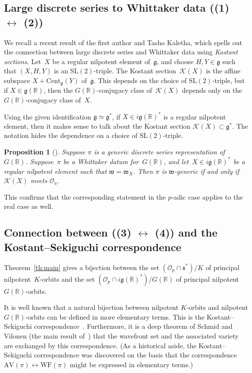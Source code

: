 \documentclass[10pt,leqno]{article}
\newtheorem{proposition}[equation]{Proposition}
\numberwithin{equation}{section}
\renewcommand{\O}{\mathcal O}
\newcommand{\R}{\mathbb R}
\newcommand{\g}{\mathfrak g}
\newcommand{\SL}{\text{SL}}
\newcommand{\s}{\mathfrak s}
\newcommand{\w}{\mathfrak w}
\newcommand{\AV}{\mathrm{AV}}
\newcommand{\WF}{\mathrm{WF}}
\newcommand{\Op}{\O_p}
\newcommand{\Kostant}[1]{\mathcal{K}(#1)}
\begin{document}
\subsection{Large discrete series to Whittaker data ((1) $\leftrightarrow$ (2))}


We recall a recent result of the first author and Tasho Kaletha, which spells out the connection between large discrete series and Whittaker data using  {\it Kostant sections}. Let~$X$ be a regular nilpotent element of~$\g$, and choose  $H, Y \in \g$ such that $(X,H,Y)$ is an  $\SL(2)$-triple. The Kostant section~$\Kostant{X}$ is the affine subspace $X + \mathrm{Cent}_{\g}(Y)$ of~$\g$. This depends on the choice of $\SL(2)$-triple, but if $X \in \g(\R)$, then the $G(\R)$-conjugacy class of~$\Kostant{X}$ depends only on the $G(\R)$-conjugacy class of~$X$. 

Using the given identification $\g \simeq \g^\ast$, if $X \in i\g(\R)^\ast$ is a regular nilpotent element, then it makes sense to talk about the Kostant section $\Kostant{X} \subset \g^\ast$. The notation hides the dependence on a choice of $\mathrm{SL}(2)$-triple. 

\begin{proposition}[\cite{adams_kaletha}]\label{JeffTasho_criterion}
Suppose $\pi$ is a generic discrete series representation of~$G(\R)$. Suppose~$\pi$ be a Whittaker datum for~$G(\R)$, and let~$X \in i\g(\R)^*$ be a regular nilpotent element such that $\w = \w_X$. 
Then $\pi$ is $\w$-generic if and only if $\Kostant{X}$ meets $\mathcal{O}_\pi$. 
\end{proposition}


This confirms that  the corresponding statement  in the $p$-adic case \cite{debacker_reeder_generic, kaletha_epipelagic}
applies to the real case as well.


\subsection{Connection between ((3) $\leftrightarrow$ (4)) and the Kostant--Sekiguchi correspondence } \label{sec:Sekiguchi}

Theorem~\ref{th:main} gives a bijection between the set $(\Op \cap \s^*)/K$ of principal nilpotent~$K$-orbits and the set $(\Op \cap i\g(\R)^*)/G(\R)$ of principal nilpotent~$G(\R)$-orbits. 

It is well known that a natural bijection between nilpotent $K$-orbits and nilpotent $G(\R)$-orbits can be defined in more elementary terms. This is the Kostant--Sekiguchi correspondence~\cite{sekiguchi}. Furthermore, it is a deep theorem of Schmid and Vilonen (the main result of~\cite{SV1}) that the wavefront set and the associated variety are exchanged by this correspondence. (As a historical aside, the Kostant--Sekiguchi correspondence was discovered on the basis that the correspondence $\AV(\pi) \leftrightarrow \WF(\pi)$ might be expressed in elementary terms.)
\end{document}
